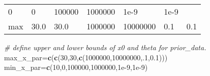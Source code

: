 \documentclass[
]{article}
\newenvironment{Shaded}{\begin{snugshade}}{\end{snugshade}}
\newcommand{\CommentTok}[1]{\textcolor[rgb]{0.56,0.35,0.01}{\textit{#1}}}
\newcommand{\DecValTok}[1]{\textcolor[rgb]{0.00,0.00,0.81}{#1}}
\newcommand{\FloatTok}[1]{\textcolor[rgb]{0.00,0.00,0.81}{#1}}
\newcommand{\KeywordTok}[1]{\textcolor[rgb]{0.13,0.29,0.53}{\textbf{#1}}}
\newcommand{\NormalTok}[1]{#1}
\begin{document}
\begin{longtable}[]{@{}lllllll@{}}
\begin{minipage}[t]{0.10\columnwidth}
0\strut
\end{minipage} & \begin{minipage}[t]{0.10\columnwidth}\raggedright
0\strut
\end{minipage} & \begin{minipage}[t]{0.15\columnwidth}\raggedright
100000\strut
\end{minipage} & \begin{minipage}[t]{0.17\columnwidth}\raggedright
1000000\strut
\end{minipage} & \begin{minipage}[t]{0.10\columnwidth}\raggedright
1e-9\strut
\end{minipage} & \begin{minipage}[t]{0.10\columnwidth}\raggedright
1e-9\strut
\end{minipage}\tabularnewline
\begin{minipage}[t]{0.10\columnwidth}\raggedright
max\strut
\end{minipage} & \begin{minipage}[t]{0.10\columnwidth}\raggedright
30.0\strut
\end{minipage} & \begin{minipage}[t]{0.10\columnwidth}\raggedright
30.0\strut
\end{minipage} & \begin{minipage}[t]{0.15\columnwidth}\raggedright
1000000\strut
\end{minipage} & \begin{minipage}[t]{0.17\columnwidth}\raggedright
10000000\strut
\end{minipage} & \begin{minipage}[t]{0.10\columnwidth}\raggedright
0.1\strut
\end{minipage} & \begin{minipage}[t]{0.10\columnwidth}\raggedright
0.1\strut
\end{minipage}\tabularnewline
\bottomrule
\end{longtable}

\begin{Shaded}
\begin{Highlighting}[]
\CommentTok{# define upper and lower bounds of x0 and theta for prior_data.}
\NormalTok{max_x_par=}\KeywordTok{c}\NormalTok{(}\KeywordTok{c}\NormalTok{(}\DecValTok{30}\NormalTok{,}\DecValTok{30}\NormalTok{,}\KeywordTok{c}\NormalTok{(}\DecValTok{1000000}\NormalTok{,}\DecValTok{10000000}\NormalTok{,.}\DecValTok{1}\NormalTok{,}\FloatTok{0.1}\NormalTok{)))}
\NormalTok{min_x_par=}\KeywordTok{c}\NormalTok{(}\DecValTok{10}\NormalTok{,}\DecValTok{0}\NormalTok{,}\DecValTok{100000}\NormalTok{,}\DecValTok{1000000}\NormalTok{,}\FloatTok{1e-9}\NormalTok{,}\FloatTok{1e-9}\NormalTok{)}
\end{Highlighting}
\end{Shaded}
\end{document}

